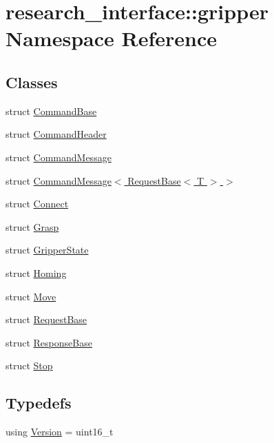 \hypertarget{namespaceresearch__interface_1_1gripper}{}\section{research\+\_\+interface\+:\+:gripper Namespace Reference}
\label{namespaceresearch__interface_1_1gripper}
\subsection*{Classes}
\begin{DoxyCompactItemize}
\item 
struct \hyperlink{structresearch__interface_1_1gripper_1_1CommandBase}{Command\+Base}
\item 
struct \hyperlink{structresearch__interface_1_1gripper_1_1CommandHeader}{Command\+Header}
\item 
struct \hyperlink{structresearch__interface_1_1gripper_1_1CommandMessage}{Command\+Message}
\item 
struct \hyperlink{structresearch__interface_1_1gripper_1_1CommandMessage_3_01RequestBase_3_01T_01_4_01_4}{Command\+Message$<$ Request\+Base$<$ T $>$ $>$}
\item 
struct \hyperlink{structresearch__interface_1_1gripper_1_1Connect}{Connect}
\item 
struct \hyperlink{structresearch__interface_1_1gripper_1_1Grasp}{Grasp}
\item 
struct \hyperlink{structresearch__interface_1_1gripper_1_1GripperState}{Gripper\+State}
\item 
struct \hyperlink{structresearch__interface_1_1gripper_1_1Homing}{Homing}
\item 
struct \hyperlink{structresearch__interface_1_1gripper_1_1Move}{Move}
\item 
struct \hyperlink{structresearch__interface_1_1gripper_1_1RequestBase}{Request\+Base}
\item 
struct \hyperlink{structresearch__interface_1_1gripper_1_1ResponseBase}{Response\+Base}
\item 
struct \hyperlink{structresearch__interface_1_1gripper_1_1Stop}{Stop}
\end{DoxyCompactItemize}
\subsection*{Typedefs}
\begin{DoxyCompactItemize}
\item 
using \hyperlink{namespaceresearch__interface_1_1gripper_a76ede520b2fa3582ac95cd919eceef5b}{Version} = uint16\+\_\+t
\end{DoxyCompactItemize}
